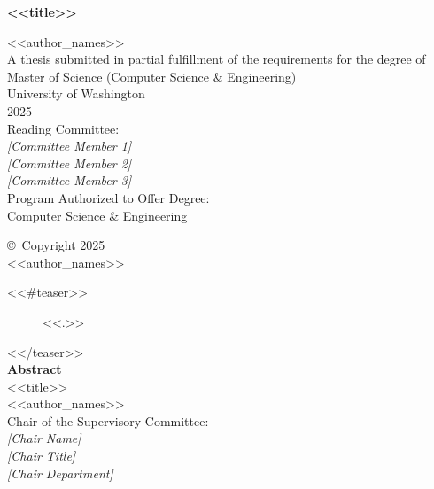 \documentclass[<<class_options>>]{template-thesis}
\numberwithin{figure}{section}
\numberwithin{table}{section}
\begin{document}
\setcounter{secnumdepth}{-1} %

\begin{titlepage}
  \thispagestyle{empty} %
  \begin{center}
    \vspace*{3cm}
    {\Large\bfseries <<title>> \par}
    \vspace{1.25cm}
    <<author_names>> \\[2em]
    A thesis submitted in partial fulfillment of the requirements for the degree of \\[2em]
    Master of Science (Computer Science \& Engineering) \\[2em]
    University of Washington \\[1em]
    2025 \\[2em]
    Reading Committee: \\
    \textit{[Committee Member 1]} \\
    \textit{[Committee Member 2]} \\
    \textit{[Committee Member 3]} \\[2em]
    
    Program Authorized to Offer Degree:\\
    Computer Science \& Engineering
  \end{center}
\end{titlepage}

\begin{titlepage}
  \thispagestyle{empty} %
  \begin{center}
    \vspace*{7cm}
    \copyright\ Copyright 2025 \\
    <<author_names>>
  \end{center}
\end{titlepage}

\clearpage
\vspace*{\fill}
\begin{center}
  <<#teaser>>
  \begin{figure}
  <<.>>
  \end{figure}
  <</teaser>> \\[2em]
  {\bfseries Abstract} \\[2em]
  {\large <<title>>} \\[1em]
  <<author_names>> \\[1em]
  Chair of the Supervisory Committee:\\
  \textit{[Chair Name]} \\
  \textit{[Chair Title]} \\
  \textit{[Chair Department]} \\[2em]
\end{center}
\thispagestyle{plain} %
\end{document}
